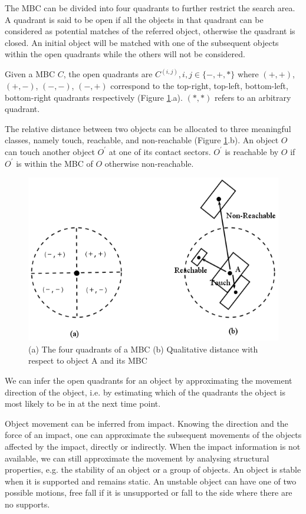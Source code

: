 \documentclass[letterpaper]{article}
\begin{document}
The MBC can be divided into four quadrants to further restrict the search area. A quadrant is said to be open if all the objects in that quadrant can be considered as potential matches of the referred object, otherwise the quadrant is closed. An initial object will be matched with one of the subsequent objects within the open quadrants while the others will not be considered. 

 Given a MBC $C$, the open quadrants are $C^{(i,j)}, i,j \in \{-, +, *\}$ where $(+,+)$, $(+,-)$, $(-,-)$, $(-,+)$ correspond to the top-right, top-left, bottom-left, bottom-right quadrants respectively (Figure \ref{Quadrants}.a). $(*, *)$ refers to an arbitrary quadrant. 

The relative distance between two objects can be allocated to three meaningful classes, namely touch, reachable, and non-reachable (Figure \ref{Quadrants}.b). An object $O$ can touch another object $O^\prime$ at one of its contact sectors. $O^\prime$ is reachable by $O$ if $O^\prime$ is within the MBC of $O$ otherwise non-reachable.

\begin{figure}[h!]\label{Quadrants}
\centering\includegraphics[scale=0.3]{quadrants.png}\caption{(a) The four quadrants of a MBC (b) Qualitative distance with respect to object A and its MBC}
\end{figure}

We can infer the open quadrants for an object by approximating the movement direction of the object, i.e. by estimating which of the quadrants the object is most likely to be in at the next time point. 

Object movement can be inferred from impact. Knowing the direction and the force of an impact, one can approximate the subsequent movements of the objects affected by the impact, directly or indirectly. When the impact information is not available, we can still approximate the movement by analysing structural properties, e.g. the stability of an object or a group of objects. An object is stable when it is supported and remains static. An unstable object can have one of two possible motions, free fall if it is unsupported or fall to the side where there are no supports. 
\end{document}
